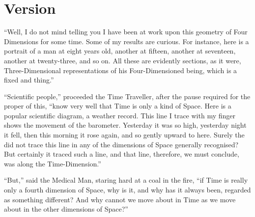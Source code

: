 \documentclass{fiche}
\begin{document}
\newpage
\section{Version}

\begin{version}
``Well, I do not mind telling you I have been at work upon this geometry of Four Dimensions
for some time. Some of my results are curious. For instance, here is a portrait of a man at
eight years old, another at fifteen, another at seventeen, another at twenty-three, and so
on. All these are evidently sections, as it were, Three-Dimensional representations of his
Four-Dimensioned being, which is a fixed and  thing.''

``Scientific people,'' proceeded the Time Traveller, after the pause required for the proper
 of this, ``know very well that Time is only a
kind of Space. Here is a popular scientific diagram, a weather record. This line I trace with
my finger shows the movement of the barometer. Yesterday it was so high, yesterday night it
fell, then this morning it rose again, and so gently upward to here. Surely the
 did not trace this line in any of the dimensions of Space
generally recognised? But certainly it traced such a line, and that line, therefore, we must
conclude, was along the Time-Dimension.''

``But,'' said the Medical Man, staring hard at a coal in the fire, ``if Time is really only a
fourth dimension of Space, why is it, and why has it always been, regarded as something
different? And why cannot we move about in Time as we move about in the other dimensions of
Space?''
\end{version}

\end{document}
